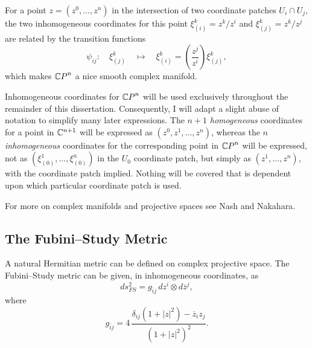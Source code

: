 For a point $z=(z^0,\ldots,z^n)$ in the intersection of 
two coordinate patches $U_i\cap U_j$,
the two inhomogeneous coordinates for this point
$\xi^k_{(i)}={z^k}/{z^i}$ and
$\xi^k_{(j)}={z^k}/{z^j}$
are related by the transition functions
\begin{equation}
\psi_{ij}\colon\quad \xi^k_{(j)}\quad\mapsto
\quad\xi^k_{(i)} = \left( \frac{z^j}{z^i} \right)
\xi^k_{(j)},
\end{equation}
which makes ${\mathbb{C} P}^n$ a nice smooth complex manifold.

Inhomogeneous coordinates for ${\mathbb{C} P}^n$ will be used
exclusively throughout the remainder of this dissertation.
Consequently, I will adapt a slight abuse of notation to simplify
many later expressions.
The $n+1$ \emph{homogeneous} coordinates for a point in ${\mathbb{C}}^{n+1}$ will be expressed
as $(z^0,z^1,\ldots,z^n)$, whereas the $n$ \emph{inhomogeneous} coordinates for the
corresponding point in ${\mathbb{C} P}^n$ will be expressed, not as
$(\xi^1_{(0)},\ldots,\xi^n_{(0)})$ in the $U_0$ coordinate patch, but
simply as $(z^1,\ldots,z^n)$, with the coordinate patch implied.
Nothing will be covered that is dependent upon which 
particular coordinate patch
is used.

For more on complex manifolds and projective spaces
see Nash\cite{Nash:91} and Nakahara\cite{Nakahara:90}.



\subsection{The Fubini--Study Metric}

%
A natural Hermitian metric can be defined on complex projective
space.\cite{Fubini:?,Study:?}
The Fubini--Study metric can be given, in inhomogeneous coordinates, as
\begin{equation}
ds_{FS}^2 = g_{\overline{i}j}\, dz^i\otimes d\overline{z}^j,
\end{equation}
where 
\begin{equation}
g_{\overline{i}j} = 4\,\frac{\delta_{ij}\left( 1 + \left| z \right|^2 \right) - 
                                                    \overline{z}_i z_j }
{ \left( 1 + \left| z\right|^2 \right)^2 }.
\label{e:fsmetric}
\end{equation}


